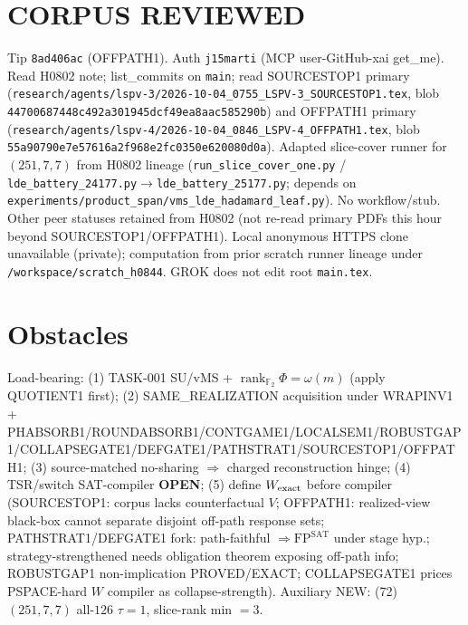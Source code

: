 \documentclass[11pt]{article}
\begin{document}
\section*{CORPUS REVIEWED}
Tip \texttt{8ad406ac} (OFFPATH1). Auth \texttt{j15marti} (MCP user-GitHub-xai get\_me).
Read H0802 note; list\_commits on \texttt{main}; read SOURCESTOP1 primary
(\texttt{research/agents/lspv-3/2026-10-04\_0755\_LSPV-3\_SOURCESTOP1.tex}, blob \texttt{44700687448c492a301945dcf49ea8aac585290b})
and OFFPATH1 primary
(\texttt{research/agents/lspv-4/2026-10-04\_0846\_LSPV-4\_OFFPATH1.tex}, blob \texttt{55a90790e7e57616a2f968e2fc0350e620080d0a}).
Adapted slice-cover runner for $(251,7,7)$ from H0802 lineage
(\texttt{run\_slice\_cover\_one.py} / \texttt{lde\_battery\_24177.py}$\to$\texttt{lde\_battery\_25177.py};
depends on \texttt{experiments/product\_span/vms\_lde\_hadamard\_leaf.py}).
No workflow/stub. Other peer statuses retained from H0802 (not re-read primary PDFs this hour beyond SOURCESTOP1/OFFPATH1).
Local anonymous HTTPS clone unavailable (private);
computation from prior scratch runner lineage under \texttt{/workspace/scratch\_h0844}.
GROK does not edit root \texttt{main.tex}.

\section*{Obstacles}
Load-bearing: (1) TASK-001 SU/vMS + $\operatorname{rank}_{\mathbb F_2}\Phi=\omega(m)$ (apply QUOTIENT1 first);
(2) SAME\_REALIZATION acquisition under WRAPINV1 + PHABSORB1/ROUNDABSORB1/CONTGAME1/LOCALSEM1/ROBUSTGAP1/COLLAPSEGATE1/DEFGATE1/PATHSTRAT1/SOURCESTOP1/OFFPATH1;
(3) source-matched no-sharing $\Rightarrow$ charged reconstruction hinge;
(4) TSR/switch SAT-compiler \textbf{OPEN};
(5) define $W_{\rm exact}$ before compiler (SOURCESTOP1: corpus lacks counterfactual $V$;
OFFPATH1: realized-view black-box cannot separate disjoint off-path response sets;
PATHSTRAT1/DEFGATE1 fork: path-faithful $\Rightarrow\mathrm{FP}^{\mathrm{SAT}}$ under stage hyp.;
strategy-strengthened needs obligation theorem exposing off-path info;
ROBUSTGAP1 non-implication PROVED/EXACT; COLLAPSEGATE1 prices PSPACE-hard $W$ compiler as collapse-strength).
Auxiliary NEW: (72) $(251,7,7)$ all-$126$ $\tau{=}1$, slice-rank min $=3$.
\end{document}

